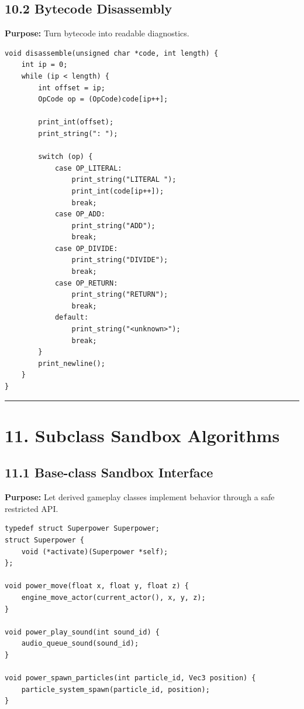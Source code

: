 \documentclass[10pt,letterpaper]{article}
\begin{document}
\subsection{10.2 Bytecode Disassembly}

\textbf{Purpose:} Turn bytecode into readable diagnostics.

\begin{verbatim}
void disassemble(unsigned char *code, int length) {
    int ip = 0;
    while (ip < length) {
        int offset = ip;
        OpCode op = (OpCode)code[ip++];

        print_int(offset);
        print_string(": ");

        switch (op) {
            case OP_LITERAL:
                print_string("LITERAL ");
                print_int(code[ip++]);
                break;
            case OP_ADD:
                print_string("ADD");
                break;
            case OP_DIVIDE:
                print_string("DIVIDE");
                break;
            case OP_RETURN:
                print_string("RETURN");
                break;
            default:
                print_string("<unknown>");
                break;
        }
        print_newline();
    }
}
\end{verbatim}

\medskip\hrule\medskip

\clearpage
\section{11. Subclass Sandbox Algorithms}

\subsection{11.1 Base-class Sandbox Interface}

\textbf{Purpose:} Let derived gameplay classes implement behavior through a safe restricted API.

\begin{verbatim}
typedef struct Superpower Superpower;
struct Superpower {
    void (*activate)(Superpower *self);
};

void power_move(float x, float y, float z) {
    engine_move_actor(current_actor(), x, y, z);
}

void power_play_sound(int sound_id) {
    audio_queue_sound(sound_id);
}

void power_spawn_particles(int particle_id, Vec3 position) {
    particle_system_spawn(particle_id, position);
}
\end{verbatim}
\end{document}
